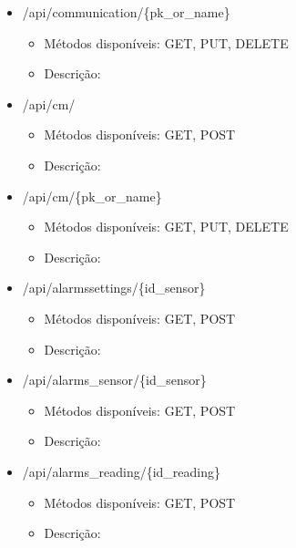 \begin{itemize}
	
	\item /api/communication/\{pk\_or\_name\}
	\begin{itemize}
		\item Métodos disponíveis: GET, PUT, DELETE
		\item Descrição: 
	\end{itemize}
	
	
	\item /api/cm/
	\begin{itemize}
		\item Métodos disponíveis: GET, POST
		\item Descrição: 
	\end{itemize}
	
	
	\item /api/cm/\{pk\_or\_name\}
	\begin{itemize}
		\item Métodos disponíveis: GET, PUT, DELETE
		\item Descrição: 
	\end{itemize}
	
	
	\item /api/alarmssettings/\{id\_sensor\}
	\begin{itemize}
		\item Métodos disponíveis: GET, POST
		\item Descrição: 
	\end{itemize}
	
	
	\item /api/alarms\_sensor/\{id\_sensor\}
	\begin{itemize}
		\item Métodos disponíveis: GET, POST
		\item Descrição: 
	\end{itemize}
	
	
	\item /api/alarms\_reading/\{id\_reading\}
	\begin{itemize}
		\item Métodos disponíveis:  GET, POST
		\item Descrição: 
	\end{itemize}
	
	
	
	
	
\end{itemize}

